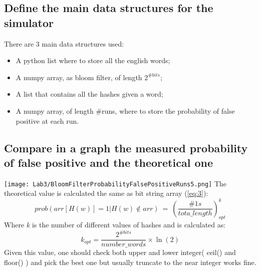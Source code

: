 \documentclass{report}
\begin{document}
			\subsection{Define the main data structures for the simulator}
						There are 3 main data structures used: 
							\begin{itemize}
								\item A python list where to store all the english words;
								\item A numpy array, as bloom filter, of length $2^{\#bits}$;
								\item A list that contains all the hashes given a word;
								\item A numpy array, of length \#runs, where to store the probability of false positive at each run.
							\end{itemize}
					
			\subsection{Compare in a graph the measured probability of false positive and the theoretical one}
			\texttt{[image: Lab3/BloomFilterProbabilityFalsePositiveRuns5.png]}
			The theoretical value is calculated the same as bit string array (\ref{eq:3}):
			\begin{equation}\label{eq:5}
				prob(arr[H(w)]=1|H(w) \not\in arr) \: = \: \left( \frac{\#1s}{tota\_length} \right)^k_{opt}
			\end{equation}
			Where \emph{k} is the number of different values of hashes and is calculated as: 
			\[
					k_{opt} = \frac {2^{\#bits}}{number\_words} \times \ln(2)
			\]
			Given this value, one should check both upper and lower integer( ceil() and floor() ) and pick the best one but usually truncate to the near integer works fine.
			
			
			\newpage 
			
\end{document}
